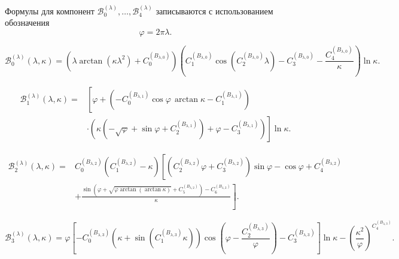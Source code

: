 Формулы для компонент \(\mathcal B_0^{(\lambda)},\ldots,\mathcal B_4^{(\lambda)}\) записываются с использованием обозначения
\begin{equation}
	\varphi=2\pi\lambda.
	\label{eq:appendixC_varphi_def}
\end{equation}

\begin{equation}
	\mathcal B_0^{(\lambda)}(\lambda,\kappa)
	=
	\left(
	\lambda\arctan(\kappa\lambda^2)+C_0^{(B_{\lambda,0})}
	\right)
	\left(
	C_1^{(B_{\lambda,0})}\cos\left(C_2^{(B_{\lambda,0})}\lambda\right)
	-C_3^{(B_{\lambda,0})}
	-\frac{C_4^{(B_{\lambda,0})}}{\kappa}
	\right)
	\ln\kappa.
	\label{eq:appendixC_B0_lam}
\end{equation}

\begin{equation}
	\begin{aligned}
		\mathcal B_1^{(\lambda)}(\lambda,\kappa)
		={}&
		\left[
		\varphi+
		\left(
		-C_0^{(B_{\lambda,1})}\cos\varphi\,\arctan\kappa
		-C_1^{(B_{\lambda,1})}
		\right)
		\right.
		\\
		&\left.
		\cdot
		\left(
		\kappa\left(-\sqrt\varphi+\sin\varphi+C_2^{(B_{\lambda,1})}\right)
		+\varphi-C_3^{(B_{\lambda,1})}
		\right)
		\right]
		\ln\kappa.
	\end{aligned}
	\label{eq:appendixC_B1_lam}
\end{equation}

\begin{equation}
	\begin{aligned}
		\mathcal B_2^{(\lambda)}(\lambda,\kappa)
		={}&
		C_0^{(B_{\lambda,2})}
		\left(C_1^{(B_{\lambda,2})}-\kappa\right)
		\left[
		\left(C_2^{(B_{\lambda,2})}\varphi+C_3^{(B_{\lambda,2})}\right)\sin\varphi
		-\cos\varphi
		+C_4^{(B_{\lambda,2})}
		\right.
		\\
		&\left.
		+
		\frac{
			\sin\left(
			\varphi+\sqrt{\varphi\arctan(\arctan\kappa)}+C_5^{(B_{\lambda,2})}
			\right)
			-C_6^{(B_{\lambda,2})}
		}{\kappa}
		\right].
	\end{aligned}
	\label{eq:appendixC_B2_lam}
\end{equation}

\begin{equation}
	\mathcal B_3^{(\lambda)}(\lambda,\kappa)
	=
	\varphi
	\left[
	-C_0^{(B_{\lambda,3})}
	\left(
	\kappa+
	\sin\left(C_1^{(B_{\lambda,3})}\kappa\right)
	\right)
	\cos\left(
	\varphi-
	\frac{C_2^{(B_{\lambda,3})}}{\varphi}
	\right)
	-C_3^{(B_{\lambda,3})}
	\right]
	\ln\kappa
	-
	\left(
	\frac{\kappa^2}{\varphi}
	\right)^{C_4^{(B_{\lambda,3})}}.
	\label{eq:appendixC_B3_lam}
\end{equation}


